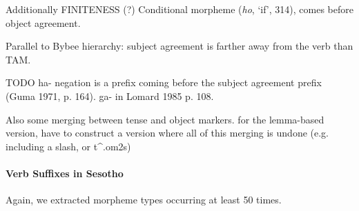 \documentclass[11pt,letterpaper]{article}
\begin{document}
Additionally FINITENESS (?) Conditional morpheme (\emph{ho}, `if', 314), comes before object agreement.

Parallel to Bybee hierarchy: subject agreement is farther away from the verb than TAM.


TODO ha- negation is a prefix coming before the subject agreement prefix (Guma 1971, p. 164).  ga- in Lomard 1985 p. 108.



Also some merging between tense and object markers. for the lemma-based version, have to construct a version where all of this merging is undone (e.g. including a slash, or t\^{}.om2s)


\paragraph{Verb Suffixes in Sesotho}

Again, we extracted morpheme types occurring at least 50 times.
\end{document}
